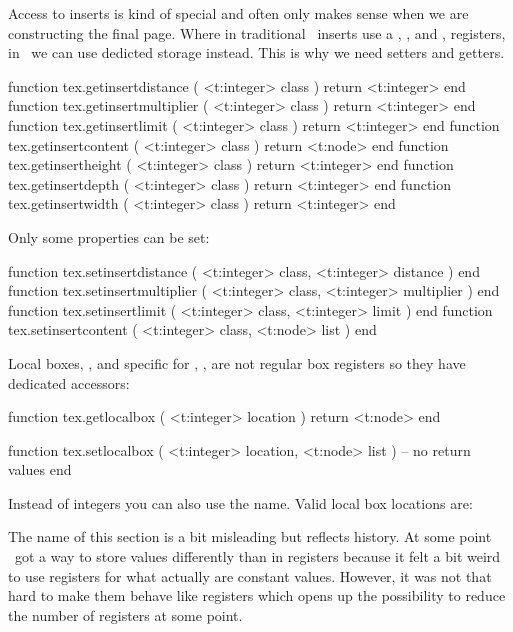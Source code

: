 \stopsubsection

\startsubsection[title=Inserts]

Access to inserts is kind of special and often only makes sense when we are
constructing the final page. Where in traditional \TEX\ inserts use a \type
{\dimen}, \type {\count}, \type {\skip} and \type {\box}, registers, in
\LUAMETATEX\ we can use dedicted storage instead. This is why we need setters and
getters.

\starttyping[option=LUA]
function tex.getinsertdistance   ( <t:integer> class ) return <t:integer> end
function tex.getinsertmultiplier ( <t:integer> class ) return <t:integer> end
function tex.getinsertlimit      ( <t:integer> class ) return <t:integer> end
function tex.getinsertcontent    ( <t:integer> class ) return <t:node>    end
function tex.getinsertheight     ( <t:integer> class ) return <t:integer> end
function tex.getinsertdepth      ( <t:integer> class ) return <t:integer> end
function tex.getinsertwidth      ( <t:integer> class ) return <t:integer> end
\stoptyping

Only some properties can be set:

\starttyping[option=LUA]
function tex.setinsertdistance   ( <t:integer> class, <t:integer> distance   ) end
function tex.setinsertmultiplier ( <t:integer> class, <t:integer> multiplier ) end
function tex.setinsertlimit      ( <t:integer> class, <t:integer> limit      ) end
function tex.setinsertcontent    ( <t:integer> class, <t:node>    list       ) end
\stoptyping

\stopsubsection

\startsubsection[title=Local boxes]

Local boxes, \typ {\localleftbox}, \typ {\localrightbox} and specific for
\LUAMETATEX, \typ {\localmiddlebox}, are not regular box registers so they have
dedicated accessors:

\starttyping[option=LUA]
function tex.getlocalbox ( <t:integer> location )
    return <t:node>
end

function tex.setlocalbox ( <t:integer> location, <t:node> list )
    -- no return values
end
\stoptyping

Instead of integers you can also use the name. Valid local box locations are:


\stopsubsection

\startsubsection[title=Constants]

The name of this section is a bit misleading but reflects history. At some point
\LUAMETATEX\ got a way to store values differently than in registers because it
felt a bit weird to use registers for what actually are constant values. However,
it was not that hard to make them behave like registers which opens up the
possibility to reduce the number of registers at some point.

